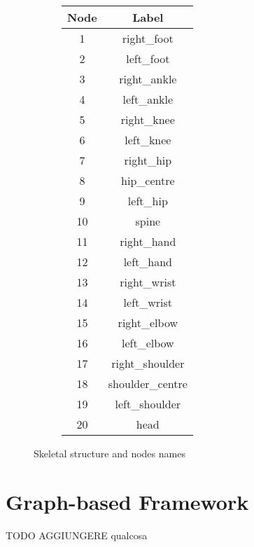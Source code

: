 \begin{figure}[H]
\begin{subfigure}[b]{0.7\linewidth}
  \end{subfigure}
  \label{fig:graph_skeletal}
  \begin{subfigure}[b]{0.29\linewidth}
    \centering
    \begin{table}[H]
      \centering
      \begin{tabular}{||c||c||}
        \hline
        \textbf{Node} & \textbf{Label} \\
        \hline
        1 & right\_foot \\
        2 & left\_foot \\
        3 & right\_ankle \\
        4 & left\_ankle \\
        5 & right\_knee \\
        6 & left\_knee \\
        7 & right\_hip \\
        8 & hip\_centre \\
        9 & left\_hip \\
        10 & spine \\
        11 & right\_hand \\
        12 & left\_hand \\
        13 & right\_wrist \\
        14 & left\_wrist \\
        15 & right\_elbow \\
        16 & left\_elbow \\
        17 & right\_shoulder \\
        18 & shoulder\_centre \\
        19 & left\_shoulder \\
        20 & head \\
        \hline
      \end{tabular}
    \end{table}
  \end{subfigure}
  \caption{Skeletal structure and nodes names}
  \label{tab:labels_joints}
\end{figure}


\section{Graph-based Framework}
TODO AGGIUNGERE qualcosa

